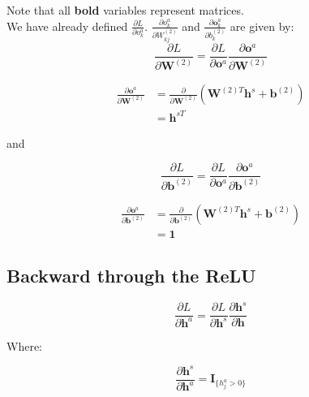 \documentclass[reqno]{amsart}
\theoremstyle{definition}
\theoremstyle{remark}
\numberwithin{equation}{section}
\begin{document}
Note that all \textbf{bold} variables represent matrices. \\

We have already defined $\frac{\partial L}{\partial o^a_k}$. $\frac{\partial o_k^a}{\partial W_{kj}^{(2)}}$ and $\frac{\partial \mathbf{o}_k^a}{\partial b_k^{(2)}}$ are given by:\\

\begin{equation}
    \frac{\partial L}{\partial \mathbf{W}^{(2)}} = \frac{\partial L}{\partial \mathbf{o}^a}\frac{\partial \mathbf{o}^a}{\partial \mathbf{W}^{(2)}}
\end{equation}

\begin{align}
    \frac{\partial \mathbf{o}^a}{\partial \mathbf{W}^{(2)}} &= \frac{\partial}{\partial \mathbf{W}^{(2)}} (\mathbf{W}^{(2)T} \mathbf{h}^s + \mathbf{b}^{(2)}) \\
    &= \mathbf{h}^{sT}
\end{align}

and

\begin{equation}
    \frac{\partial L}{\partial \mathbf{b}^{(2)}} = \frac{\partial L}{\partial \mathbf{o}^a}\frac{\partial \mathbf{o}^a}{\partial \mathbf{b}^{(2)}}
\end{equation}

\begin{align}
    \frac{\partial \mathbf{o}^a}{\partial \mathbf{b}^{(2)}} &= \frac{\partial}{\partial \mathbf{b}^{(2)}} (\mathbf{W}^{(2)T} \mathbf{h}^s + \mathbf{b}^{(2)}) \\
    &= \mathbf{1}
\end{align}


\subsection{Backward through the ReLU}

\begin{equation}
    \frac{\partial L}{\partial \mathbf{h}^a} = \frac{\partial L}{\partial \mathbf{h}^s} \frac{\partial \mathbf{h}^s}{\partial \mathbf{h}}
\end{equation}

Where:

\begin{equation}
    \frac{\partial \mathbf{h}^s}{\partial \mathbf{h}^a} = \mathbf{I}_{\{h_j^a > 0\}}
\end{equation}
\end{document}
